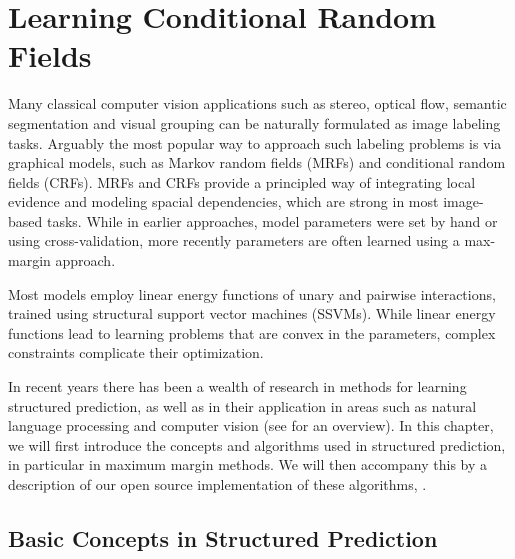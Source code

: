 \chapter{Learning Conditional Random Fields}\label{ch:structured_pystruct}

Many classical computer vision applications such as stereo, optical flow, semantic
segmentation and visual grouping can be naturally formulated as image labeling tasks.
%
Arguably the most popular way to approach such labeling problems is via graphical
models, such as Markov random fields (MRFs) and conditional random fields (CRFs).
MRFs and CRFs provide a principled way of integrating local evidence and
modeling spacial dependencies, which are strong in most image-based tasks.
%
While in earlier approaches, model parameters were set by hand or using
cross-validation, more recently parameters are often learned using a max-margin
approach.

Most models employ linear energy functions of unary and pairwise interactions,
trained using structural support vector machines (SSVMs). While linear energy
functions lead to learning problems that are convex in the parameters, complex
constraints complicate their optimization. 

In recent years there has been a wealth of research in methods for learning
structured prediction, as well as in their application in areas such as natural
language processing and computer vision (see \citet{nowozin2011structured} for
an overview).
%
In this chapter, we will first introduce the concepts and algorithms used in
structured prediction, in particular in maximum margin methods. We will then
accompany this by a description of our open source implementation of these
algorithms, \pystruct.

\section{Basic Concepts in Structured Prediction}


